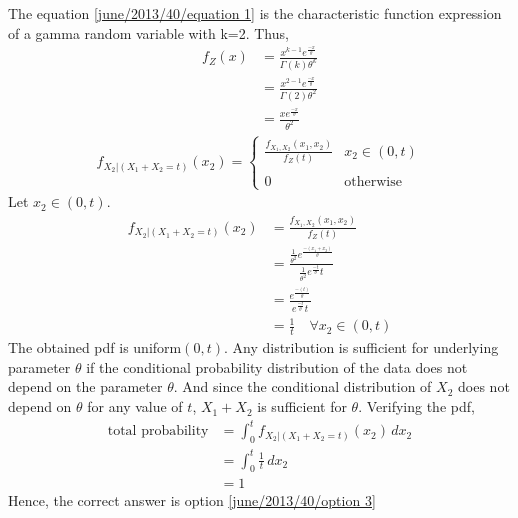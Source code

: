 The equation \eqref{june/2013/40/equation 1} is the characteristic function expression of a gamma random variable with k=2. Thus,
\begin{align}
    f_Z(x) &= \frac{x^{k-1}e^{\frac{-x}{\theta}}}{\Gamma(k)\theta^k}
    \\ &=  \frac{x^{2-1}e^{\frac{-x}{\theta}}}{\Gamma(2)\theta^2}
    \\ &= \frac{xe^{\frac{-x}{\theta}}}{\theta^2}
\end{align}
\begin{align}
    f_{X_2|(X_1+X_2=t)}(x_2) = 
    \begin{cases}
    \frac{f_{X_1,X_2}(x_1,x_2)}{f_Z(t)} &  x_2 \in (0, t)\\ ~\\[-1em]
    0 & \text{otherwise}
    \end{cases}
\end{align}
Let $ x_2 \in (0, t)$.
\begin{align}
    f_{X_2|(X_1+X_2=t)}(x_2) &= \frac{f_{X_1,X_2}(x_1,x_2)}{f_Z(t)}
    \\&= \frac{\frac{1}{\theta^2}e^{\frac{-(x_1+x_2)}{\theta}}}{\frac{1}{\theta^2}e^{\frac{-t}{\theta}}t}
    \\&= \frac{e^{\frac{-(t)}{\theta}}}{e^{\frac{-t}{\theta}}t}
    \\&= \frac{1}{t} \quad \forall x_2 \in (0, t)
\end{align}
The obtained pdf is uniform$(0,t)$. Any distribution is sufficient for underlying parameter $\theta$ if the conditional probability distribution of the data does not depend on the parameter $\theta$.  And since the conditional distribution of $X_2$ does not depend on $\theta$ for any value of $t$, $X_1+X_2$ is sufficient for $\theta$. Verifying the pdf,
\begin{align}
    \text{total probability} &= \int_{0}^{t} f_{X_2|(X_1+X_2=t)}(x_2) \,dx_2
    \\&= \int_{0}^{t} \frac{1}{t} \,dx_2
    \\&= 1
\end{align}
Hence, the correct answer is option \eqref{june/2013/40/option 3}